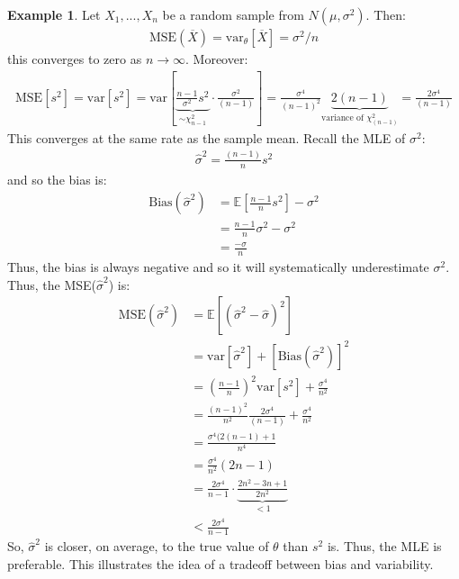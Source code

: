 \documentclass[11pt]{scrartcl}
\theoremstyle{definition}
\newtheorem{ex}{Example}
\theoremstyle{remark}
\newcommand{\EX}[1]{\mathbb{E}\left[#1 \right]}
\begin{document}
{\begin{ex} 
	Let $X_1, ..., X_n$ be a random sample from $N(\mu, \sigma^2)$. Then: 
	\begin{align*}
		\text{MSE}(\overline{X}) = \text{var}_\theta[\overline{X}] = \sigma^2 / n 	
	\end{align*}
	this converges to zero as $ n \rightarrow \infty$. Moreover: 
	\begin{align*}
		\text{MSE}[s^2] = \text{var}[s^2] = \text{var}\left[ \underbrace{ \frac{n-1}{\sigma^2} s^2}_{\sim \chi_{n-1}^2} \cdot \frac{\sigma^2}{(n-1)}	\right] 	= \frac{\sigma^4}{(n-1)^2} \underbrace{2(n-1)}_{\text{variance of } \chi_{(n-1)}^2} = \frac{2\sigma^4}{(n-1)}
	\end{align*}
	This converges at the same rate as the sample mean. Recall the MLE of $\sigma^2$: 
	\begin{align*}
		\hat{\sigma}^2 = \frac{(n-1)}{n} s^2	
	\end{align*}
	and so the bias is: 
	\begin{align*}
		\text{Bias}(\hat{\sigma}^2) & = \EX{\frac{n-1}{n	} s^2}  - \sigma^2 \\
			 & = \frac{n-1}{n} \sigma^2 - \sigma^2 \\
			 & = \frac{-\sigma}{n} 	
	\end{align*}
	Thus, the bias is always negative and so it will systematically underestimate $\sigma^2$. Thus, the MSE($\hat{\sigma}^2$) is: 
	\begin{align*}
		\text{MSE}(\hat{\sigma}^2) & =  \EX{(\hat{\sigma}^2 - \hat{\sigma})^2}  	\\
		 & = \text{var}[\hat{\sigma}^2] + [\text{Bias}(\hat{\sigma}^2)]^2 \\
		 & = \left( \frac{n-1}{n} \right)^2 \text{var}[s^2] + \frac{\sigma^4}{n^2} \\
		 & = \frac{(n-1)^2}{n^2} \frac{2 \sigma^4}{(n-1)} + \frac{\sigma^4}{n^2} \\
		 & = \frac{\sigma^4(2(n-1)+1}{n^4} \\
		 & = \frac{\sigma^4}{n^2} (2n-1) \\
		 & = \frac{2 \sigma^4}{n-1} \cdot \underbrace{\frac{2n^2 - 3n +1}{2n^2}}_{< 1} \\
		 & < \frac{2 \sigma^4}{n-1}
	\end{align*}
	So, $\hat{\sigma}^2$ is closer, on average, to the true value of $\theta$ than $s^2$ is. Thus, the MLE is preferable. This illustrates the idea of a tradeoff between bias and variability. 
\end{ex}

}
\end{document}
